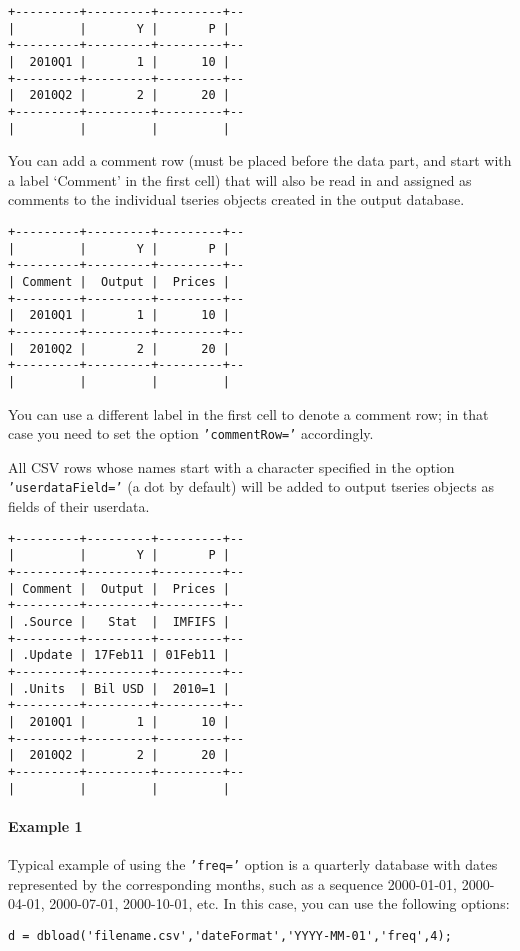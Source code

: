 \begin{verbatim}
+---------+---------+---------+--
|         |       Y |       P |
+---------+---------+---------+--
|  2010Q1 |       1 |      10 |
+---------+---------+---------+--
|  2010Q2 |       2 |      20 |
+---------+---------+---------+--
|         |         |         |
\end{verbatim}

You can add a comment row (must be placed before the data part, and
start with a label `Comment' in the first cell) that will also be read
in and assigned as comments to the individual tseries objects created in
the output database.

\begin{verbatim}
+---------+---------+---------+--
|         |       Y |       P |
+---------+---------+---------+--
| Comment |  Output |  Prices |
+---------+---------+---------+--
|  2010Q1 |       1 |      10 |
+---------+---------+---------+--
|  2010Q2 |       2 |      20 |
+---------+---------+---------+--
|         |         |         |
\end{verbatim}

You can use a different label in the first cell to denote a comment row;
in that case you need to set the option \texttt{'commentRow='}
accordingly.

All CSV rows whose names start with a character specified in the option
\texttt{'userdataField='} (a dot by default) will be added to output
tseries objects as fields of their userdata.

\begin{verbatim}
+---------+---------+---------+--
|         |       Y |       P |
+---------+---------+---------+--
| Comment |  Output |  Prices |
+---------+---------+---------+--
| .Source |   Stat  |  IMFIFS |
+---------+---------+---------+--
| .Update | 17Feb11 | 01Feb11 |
+---------+---------+---------+--
| .Units  | Bil USD |  2010=1 |
+---------+---------+---------+--
|  2010Q1 |       1 |      10 |
+---------+---------+---------+--
|  2010Q2 |       2 |      20 |
+---------+---------+---------+--
|         |         |         |
\end{verbatim}

\paragraph{Example 1}\label{example-1}

Typical example of using the \texttt{'freq='} option is a quarterly
database with dates represented by the corresponding months, such as a
sequence 2000-01-01, 2000-04-01, 2000-07-01, 2000-10-01, etc. In this
case, you can use the following options:

\begin{verbatim}
d = dbload('filename.csv','dateFormat','YYYY-MM-01','freq',4);
\end{verbatim}


